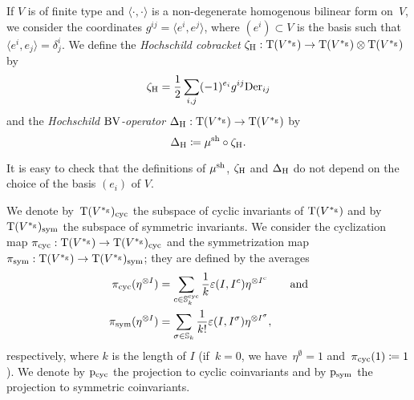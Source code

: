 \documentclass[\MainFolder/Text.tex]{subfiles}
\begin{document}
\begin{Definition}
If $V$ is of finite type and $\langle\cdot,\cdot\rangle$ is a non-degenerate homogenous bilinear form on~$V$, we consider the coordinates $g^{ij} = \langle e^i,e^j\rangle$, where $(e^i)\subset V$ is the basis such that $\langle e^i,e_j\rangle = \delta^i_j$. We define the \emph{Hochschild cobracket} $\zeta_{\mathrm{H}}: \mathrm{T}(V^{*_{\mathrm{g}}}) \rightarrow \mathrm{T}(V^{*_{\mathrm{g}}}) \otimes \mathrm{T}(V^{*_{\mathrm{g}}})$ by
\begin{equation}
\zeta_{\mathrm{H}} = \frac{1}{2}\sum_{i,j} (-1)^{e_i} g^{ij} \mathrm{Der}_{ij}
\end{equation}
and the \emph{Hochschild $\mathrm{BV}$-operator} $\operatorname{\Delta}_{\mathrm{H}}: \mathrm{T}(V^{*_{\mathrm{g}}}) \rightarrow \mathrm{T}(V^{*_{\mathrm{g}}})$ by
\begin{equation}
\operatorname{\Delta}_{\mathrm{H}} \coloneqq \mu^{\mathrm{sh}} \circ \zeta_{\mathrm{H}}.
\end{equation}
\end{Definition}

It is easy to check that the definitions of $\mu^{\mathrm{sh}}$, $\zeta_{\mathrm{H}}$ and $\operatorname{\Delta}_{\mathrm{H}}$ do not depend on the choice of the basis $(e_i)$ of $V$.

We denote by~$\mathrm{T}(V^{*_{\mathrm{g}}})_{\mathrm{cyc}}$ the subspace of cyclic invariants of $\mathrm{T}(V^{*_{\mathrm{g}}})$  and by $\mathrm{T}(V^{*_{\mathrm{g}}})_{\mathrm{sym}}$ the subspace of symmetric invariants. We consider the cyclization map $\pi_{\mathrm{cyc}}: \mathrm{T}(V^{*_{\mathrm{g}}}) \rightarrow \mathrm{T}(V^{*_{\mathrm{g}}})_{\mathrm{cyc}}$ and the symmetrization map $\pi_{\mathrm{sym}}: \mathrm{T}(V^{*_{\mathrm{g}}}) \rightarrow \mathrm{T}(V^{*_{\mathrm{g}}})_{\mathrm{sym}}$; they are defined by the averages
\begin{align*}
\pi_{\mathrm{cyc}}(\eta^{\otimes I})&= \sum_{c\in\mathbb{S}^{\mathrm{cyc}}_k}\frac{1}{k} \varepsilon(I,I^c) \eta^{\otimes I^c}\qquad\text{and}\\
\pi_{\mathrm{sym}}(\eta^{\otimes I}) &= \sum_{\sigma\in\mathbb{S}_k}\frac{1}{k!} \varepsilon(I,I^\sigma) \eta^{\otimes I^\sigma},
\end{align*}
respectively, where $k$ is the length of $I$ (if~$k=0$, we have~$\eta^{\emptyset}=1$ and~$\pi_{\mathrm{cyc}}(1) \coloneqq 1$). We denote by $\mathrm{p}_{\mathrm{cyc}}$ the projection to cyclic coinvariants and by $\mathrm{p}_{\mathrm{sym}}$ the projection to symmetric coinvariants.
\end{document}

